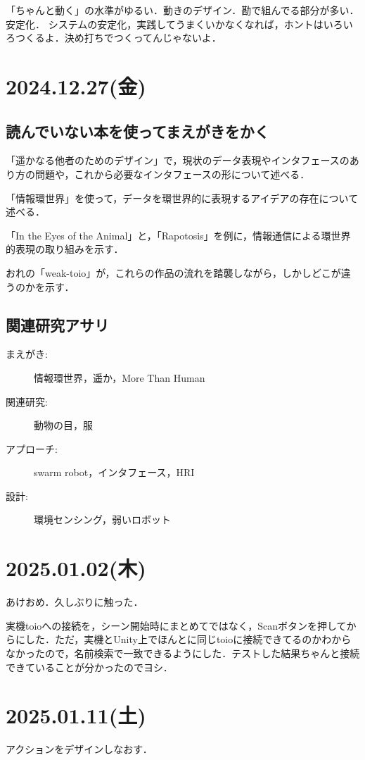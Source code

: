 \documentclass[fleqn,twocolumn]{mynote}
\begin{document}
  「ちゃんと動く」の水準がゆるい．動きのデザイン．勘で組んでる部分が多い．安定化．
  システムの安定化，実践してうまくいかなくなれば，ホントはいろいろつくるよ．決め打ちでつくってんじゃないよ．

  \section*{2024.12.27(金)}

  \subsection*{読んでいない本を使ってまえがきをかく}
  「遥かなる他者のためのデザイン」で，現状のデータ表現やインタフェースのあり方の問題や，これから必要なインタフェースの形について述べる．

  「情報環世界」を使って，データを環世界的に表現するアイデアの存在について述べる．

  「In the Eyes of the Animal」と，「Rapotosis」を例に，情報通信による環世界的表現の取り組みを示す．

  おれの「weak-toio」が，これらの作品の流れを踏襲しながら，しかしどこが違うのかを示す．

  \subsection*{関連研究アサリ}
  \begin{description}
    \item[まえがき:]情報環世界，遥か，More Than Human
    \item[関連研究:]動物の目，服
    \item[アプローチ:]swarm robot，インタフェース，HRI
    \item[設計:]環境センシング，弱いロボット
  \end{description}

  \section*{2025.01.02(木)}
  あけおめ．久しぶりに触った．

  実機toioへの接続を，シーン開始時にまとめてではなく，Scanボタンを押してからにした．ただ，実機とUnity上でほんとに同じtoioに接続できてるのかわからなかったので，名前検索で一致できるようにした．テストした結果ちゃんと接続できていることが分かったのでヨシ．

  \section*{2025.01.11(土)}
  アクションをデザインしなおす．
\end{document}
